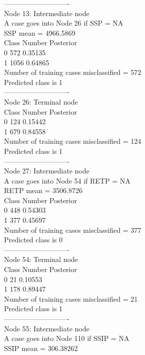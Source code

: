 \documentclass[12pt]{article}
\begin{document}
 ----------------------------\\
Node 13: Intermediate node\\
 A case goes into Node 26 if SSP = NA\\
 SSP mean = 4966.5869\\
 Class      Number   Posterior\\
 0             572     0.35135\\
 1            1056     0.64865\\
 Number of training cases misclassified = 572\\
 Predicted class is 1\\
 ----------------------------\\
Node 26: Terminal node\\
 Class      Number   Posterior\\
 0             124     0.15442\\
 1             679     0.84558\\
 Number of training cases misclassified = 124\\
 Predicted class is 1\\
 ----------------------------\\
Node 27: Intermediate node\\
 A case goes into Node 54 if RETP = NA\\
 RETP mean = 3506.8726\\
 Class      Number   Posterior\\
 0             448     0.54303\\
 1             377     0.45697\\
 Number of training cases misclassified = 377\\
 Predicted class is 0\\
 ----------------------------\\
Node 54: Terminal node\\
 Class      Number   Posterior\\
 0              21     0.10553\\
 1             178     0.89447\\
 Number of training cases misclassified = 21\\
 Predicted class is 1\\
 ----------------------------\\
Node 55: Intermediate node\\
 A case goes into Node 110 if SSIP = NA\\
 SSIP mean = 306.38262\\
\end{document}
